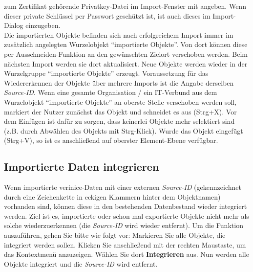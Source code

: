 \documentclass[a4paper,10pt]{book}
\begin{document}
zum Zertifikat gehörende Privatkey-Datei im Import-Fenster mit angeben. Wenn dieser private Schlüssel per Passwort geschützt ist, ist auch dieses im Import-Dialog einzugeben.
\newline\\
Die importierten Objekte befinden sich nach erfolgreichem Import immer im zusätzlich angelegten Wurzelobjekt ``importierte Objekte''. Von dort
können diese per Ausschneiden-Funktion an den gewünschten Zielort verschoben werden. Beim nächsten Import werden sie dort aktualisiert.
Neue Objekte werden wieder in der Wurzelgruppe ``importierte Objekte'' erzeugt. Voraussetzung für das Wiedererkennen der Objekte über mehrere Imports ist die Angabe derselben \textit{Source-ID}.
\newline
Wenn eine gesamte Organisation / ein IT-Verbund aus dem Wurzelobjekt ``importierte Objekte'' an oberste Stelle verschoben werden soll, markiert der Nutzer zunächst das
Objekt und schneidet es aus (Strg+X). Vor dem Einfügen ist dafür zu sorgen, dass keinerlei Objekte mehr selektiert sind (z.B. durch Abwählen des
Objekts mit Strg-Klick). Wurde das Objekt eingefügt (Strg+V), so ist es anschließend auf oberster Element-Ebene verfügbar.

\subsection{Importierte Daten integrieren} \label{Importiere Daten integrieren}
Wenn importierte verinice-Daten mit einer externen \textit{Source-ID} (gekennzeichnet durch eine Zeichenkette in eckigen Klammern hinter dem Objektnamen) vorhanden sind, können diese in den bestehenden Datenbestand
wieder integriert werden. Ziel ist es, importierte oder schon mal exportierte Objekte nicht mehr als solche wiederzuerkennen (die \textit{Source-ID} wird wieder entfernt).
Um die Funktion auszuführen, gehen Sie bitte wie folgt vor: Markieren Sie alle Objekte, die integriert werden sollen. Klicken Sie anschließend mit der rechten Maustaste, um das Kontextmenü anzuzeigen.
Wählen Sie dort \textbf{Integrieren} aus. Nun werden alle Objekte integriert und die \textit{Source-ID} wird entfernt.
\end{document}
